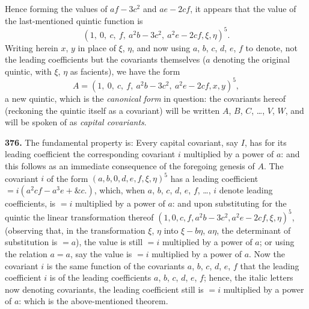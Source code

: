 \documentclass[11pt,a4paper]{book}
\providecommand{\between}{,}
\begin{document}
Hence forming the values of $af - 3c^2$ and $ae - 2cf$, it appears that the value of the last-mentioned quintic function is
\[
(1,\ 0,\ c,\ f,\ a^2 b - 3c^2,\ a^2 e - 2cf \between \xi, \eta)^5.
\]
Writing herein $x$, $y$ in place of $\xi$, $\eta$, and now using $a$, $b$, $c$, $d$, $e$, $f$ to denote, not the leading coefficients but the covariants themselves ($a$ denoting the original quintic, with $\xi$, $\eta$ as facients), we have the form
\[
A = (1,\ 0,\ c,\ f,\ a^2 b - 3c^2,\ a^2 e - 2cf \between x, y)^5,
\]
a new quintic, which is the \textit{canonical form} in question: the covariants hereof (reckoning the quintic itself as a covariant) will be written $A$, $B$, $C$, \ldots, $V$, $W$, and will be spoken of as \textit{capital covariants}.

\medskip

\noindent\textbf{376.} The fundamental property is: Every capital covariant, say $I$, has for its leading coefficient the corresponding covariant $i$ multiplied by a power of $a$: and this follows as an immediate consequence of the foregoing genesis of $A$. The covariant $i$ of the form $(a, b, 0, d, e, f \between \xi, \eta)^5$ has a leading coefficient $= i(a^2 cf - a^3 e + \&c.)$, which, when $a$, $b$, $c$, $d$, $e$, $f$, \ldots, $i$ denote leading coefficients, is $= i$ multiplied by a power of $a$: and upon substituting for the quintic the linear transformation thereof $(1, 0, c, f, a^2 b - 3c^2, a^2 e - 2cf \between \xi, \eta)^5$, (observing that, in the transformation $\xi$, $\eta$ into $\xi - b\eta$, $a\eta$, the determinant of substitution is $= a$), the value is still $= i$ multiplied by a power of $a$; or using the relation $a = a$, say the value is $= i$ multiplied by a power of $a$. Now the covariant $i$ is the same function of the covariants $a$, $b$, $c$, $d$, $e$, $f$ that the leading coefficient $i$ is of the leading coefficients $a$, $b$, $c$, $d$, $e$, $f$; hence, the italic letters now denoting covariants, the leading coefficient still is $= i$ multiplied by a power of $a$: which is the above-mentioned theorem.

\medskip
\end{document}
